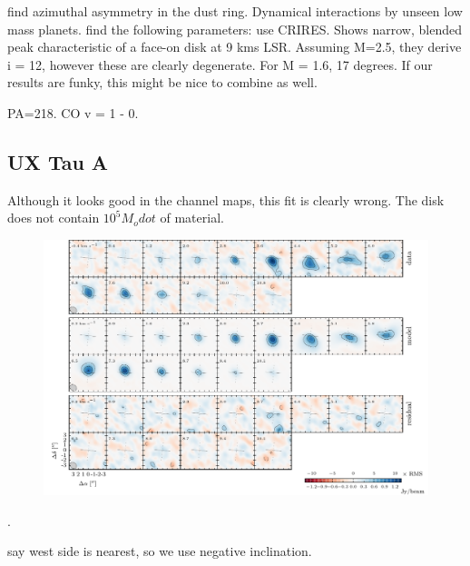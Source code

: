 \documentclass[twocolumn]{aastex6}
\begin{document}
\citet{isella13} find azimuthal asymmetry in the dust ring. Dynamical interactions by unseen low mass planets.
\citep{andrews11a} find the following parameters:
\citep{pontoppidan11} use CRIRES. Shows narrow, blended peak characteristic of a face-on disk at 9 kms LSR. Assuming M=2.5, they derive i = 12, however these are clearly degenerate. For M = 1.6, 17 degrees. If our results are funky, this might be nice to combine as well.

PA=218. CO v = 1 - 0.



\subsection{UX Tau A}

Although it looks good in the channel maps, this fit is clearly wrong. The disk does not contain $10^5 M_odot$ of material.

\begin{figure}[htb]
\begin{center}
  \includegraphics{UXTauA.pdf}
  \end{center}
\end{figure}

\citep{espaillat07}.

\citet{tanii12} say west side is nearest, so we use negative inclination.
\end{document}
